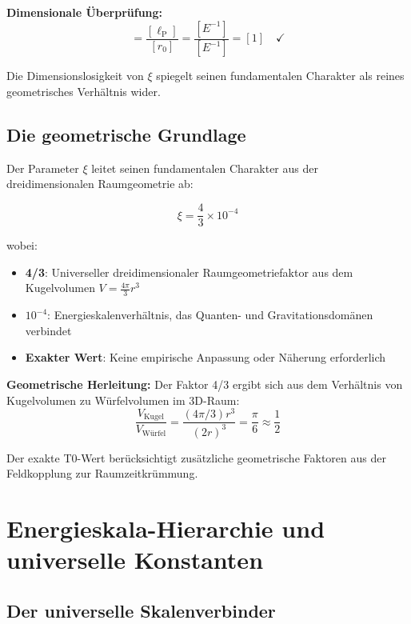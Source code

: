 \documentclass[12pt,a4paper]{report}
\newcommand{\lP}{\ell_{\text{P}}}         %
\newcommand{\rzero}{r_0}                  %
\begin{document}
	\textbf{Dimensionale Überprüfung:}
	\begin{equation}
		[\xi] = \frac{[\lP]}{[\rzero]} = \frac{[E^{-1}]}{[E^{-1}]} = [1] \quad \checkmark
	\end{equation}
	
	Die Dimensionslosigkeit von $\xi$ spiegelt seinen fundamentalen Charakter als reines geometrisches Verhältnis wider.
	
	\subsection{Die geometrische Grundlage}
	\label{subsec:geometric_foundation}
	
	Der Parameter $\xi$ leitet seinen fundamentalen Charakter aus der dreidimensionalen Raumgeometrie ab:
	
	\begin{equation}
		\xi = \frac{4}{3} \times 10^{-4}
	\end{equation}
	
	wobei:
	\begin{itemize}
		\item \textbf{4/3}: Universeller dreidimensionaler Raumgeometriefaktor aus dem Kugelvolumen $V = \frac{4\pi}{3}r^3$
		\item \textbf{$10^{-4}$}: Energieskalenverhältnis, das Quanten- und Gravitationsdomänen verbindet
		\item \textbf{Exakter Wert}: Keine empirische Anpassung oder Näherung erforderlich
	\end{itemize}
	
	\textbf{Geometrische Herleitung:}
	Der Faktor 4/3 ergibt sich aus dem Verhältnis von Kugelvolumen zu Würfelvolumen im 3D-Raum:
	\begin{equation}
		\frac{V_{\text{Kugel}}}{V_{\text{Würfel}}} = \frac{(4\pi/3)r^3}{(2r)^3} = \frac{\pi}{6} \approx \frac{1}{2}
	\end{equation}
	
	Der exakte T0-Wert berücksichtigt zusätzliche geometrische Faktoren aus der Feldkopplung zur Raumzeitkrümmung.
	
	\section{Energieskala-Hierarchie und universelle Konstanten}
	\label{sec:energy_scale_hierarchy}
	
	\subsection{Der universelle Skalenverbinder}
	\label{subsec:universal_scale_connector}
	
\end{document}
